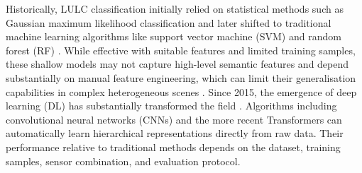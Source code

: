 \documentclass[]{interact}
\theoremstyle{plain}%
\theoremstyle{definition}
\theoremstyle{remark}
\DeclareRobustCommand{\DIFadd}[1]{{\protect\color{DIFaddcolor}\uwave{#1}}}
\DeclareRobustCommand{\DIFdel}[1]{{\protect\color{DIFdelcolor}\sout{#1}}}
\def\DIFadd#1{#1}%
\def\DIFdel#1{}%
\begin{document}
Historically, LULC classification initially relied on statistical methods such as Gaussian maximum likelihood classification and later shifted to traditional machine learning algorithms like \DIFdel{Support} \DIFdel{Vector} \DIFdel{Machines} \DIFadd{support} \DIFadd{vector} \DIFadd{machine} (SVM) and \DIFdel{Random} \DIFdel{Forest} \DIFadd{random} \DIFadd{forest} (RF) {\color{blue}\citep{belgiu2016random}}. While effective \DIFdel{for} \DIFdel{small-scale} \DIFdel{areas} \DIFadd{with} \DIFadd{suitable} \DIFadd{features} \DIFadd{and} \DIFadd{limited} \DIFadd{training} \DIFadd{samples}, these shallow models \DIFdel{often} \DIFdel{fail} \DIFdel{to} \DIFadd{may} \DIFadd{not} capture high-level semantic features and depend substantially on manual feature engineering, which \DIFdel{consequently} \DIFdel{limits} \DIFadd{can} \DIFadd{limit} their \DIFdel{generalization} \DIFadd{generalisation} capabilities in complex heterogeneous scenes {\color{blue}\citep{56}}. Since 2015, the emergence of \DIFdel{Deep} \DIFdel{Learning} \DIFadd{deep} \DIFadd{learning} (DL) has substantially transformed the field \citep{2}. Algorithms including \DIFdel{Convolutional} \DIFdel{Neural} \DIFdel{Network} \DIFadd{convolutional} \DIFadd{neural} \DIFadd{networks} (\DIFdel{CNN}\hspace{0.33em}\DIFadd{CNNs}) and the more recent \DIFdel{Transformer} \DIFdel{have} \DIFdel{consistently} \DIFdel{outperformed} \DIFdel{traditional} \DIFdel{methods} \DIFdel{by} \DIFadd{Transformers} \DIFadd{can} automatically \DIFdel{learning} \DIFadd{learn} hierarchical representations directly from raw data\DIFadd{.} \DIFadd{Their} \DIFadd{performance} \DIFadd{relative} \DIFadd{to} \DIFadd{traditional} \DIFadd{methods} \DIFadd{depends} \DIFadd{on} \DIFadd{the} \DIFadd{dataset}\DIFadd{,} \DIFadd{training} \DIFadd{samples}\DIFadd{,} \DIFadd{sensor} \DIFadd{combination}\DIFadd{,} \DIFadd{and} \DIFadd{evaluation} \DIFadd{protocol}.
\end{document}
